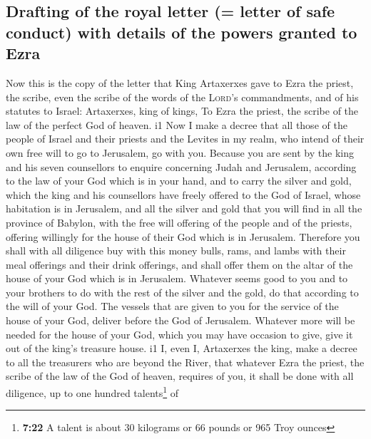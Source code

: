 \hypertarget{drafting-of-the-royal-letter-letter-of-safe-conduct-with-details-of-the-powers-granted-to-ezra}{%
\subsection{Drafting of the royal letter (= letter of safe conduct) with
details of the powers granted to
Ezra}\label{drafting-of-the-royal-letter-letter-of-safe-conduct-with-details-of-the-powers-granted-to-ezra}}

 Now this is the copy of the letter that King Artaxerxes
gave to Ezra the priest, the scribe, even the scribe of the words of the
\textsc{Lord}'s commandments, and of his statutes to Israel:
 Artaxerxes, king of kings, To Ezra the priest, the
scribe of the law of the perfect God of heaven. i1 Now  I
make a decree that all those of the people of Israel and their priests
and the Levites in my realm, who intend of their own free will to go to
Jerusalem, go with you.  Because you are sent by the king
and his seven counsellors to enquire concerning Judah and Jerusalem,
according to the law of your God which is in your hand, 
and to carry the silver and gold, which the king and his counsellors
have freely offered to the God of Israel, whose habitation is in
Jerusalem,  and all the silver and gold that you will
find in all the province of Babylon, with the free will offering of the
people and of the priests, offering willingly for the house of their God
which is in Jerusalem.  Therefore you shall with all
diligence buy with this money bulls, rams, and lambs with their meal
offerings and their drink offerings, and shall offer them on the altar
of the house of your God which is in Jerusalem.  Whatever
seems good to you and to your brothers to do with the rest of the silver
and the gold, do that according to the will of your God. 
The vessels that are given to you for the service of the house of your
God, deliver before the God of Jerusalem.  Whatever more
will be needed for the house of your God, which you may have occasion to
give, give it out of the king's treasure house. i1  I,
even I, Artaxerxes the king, make a decree to all the treasurers who are
beyond the River, that whatever Ezra the priest, the scribe of the law
of the God of heaven, requires of you, it shall be done with all
diligence,  up to one hundred talents\footnote{\textbf{7:22}
  A talent is about 30 kilograms or 66 pounds or 965 Troy ounces} of
